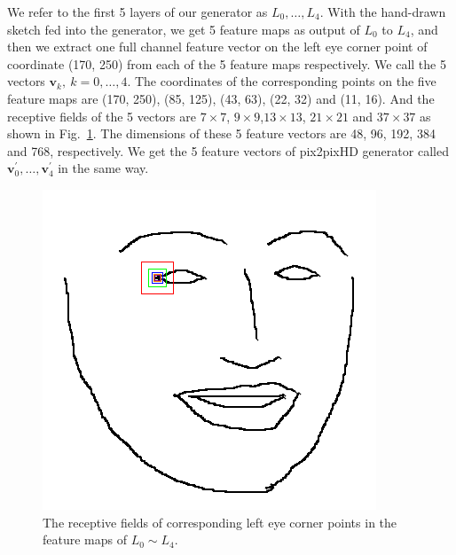 \documentclass[10pt,twocolumn,letterpaper]{article}
\begin{document}
We refer to the first 5 layers of our generator as $L_0,\ldots,L_4$. 
With the hand-drawn sketch fed into the generator, we get 5 feature maps as output of $L_0$ to $L_4$, and then we extract one full channel feature vector on the left eye corner point of coordinate (170, 250) from each of the 5 feature maps respectively. 
We call the 5 vectors $\boldsymbol{v}_k,~k=0,\ldots,4$. 
The coordinates of the corresponding points on the five feature maps are (170, 250), (85, 125), (43, 63), (22, 32) and (11, 16). 
And the receptive fields of the 5 vectors are $7\times7$, $9\times9$,$13\times13$, $21\times21$ and $37\times37$ as shown in Fig.~\ref{fig:receptive}. 
The dimensions of these 5 feature vectors are 48, 96, 192, 384 and 768, respectively. 
We get the 5 feature vectors of pix2pixHD generator called $\boldsymbol{v}_0^{'},\ldots,\boldsymbol{v}_4^{'}$ in the same way.
\begin{figure}[htbp]
	\begin{center}
		\includegraphics[width=0.2 \textwidth]{receptive_field.png}
	\end{center}
	\caption{The receptive fields of corresponding left eye corner points in the feature maps of $L_0\sim L_4$. }
	\label{fig:receptive}
\end{figure}
\end{document}
